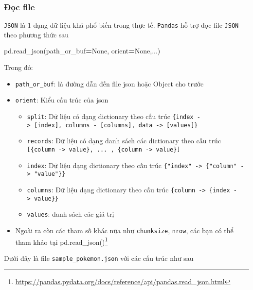 \documentclass[
]{book}
\newenvironment{Shaded}{\begin{snugshade}}{\end{snugshade}}
\newcommand{\NormalTok}[1]{#1}
\newcommand{\OperatorTok}[1]{\textcolor[rgb]{0.81,0.36,0.00}{\textbf{#1}}}
\newcommand{\VariableTok}[1]{\textcolor[rgb]{0.00,0.00,0.00}{#1}}
\providecommand{\tightlist}{%
  \setlength{\itemsep}{0pt}\setlength{\parskip}{0pt}}
\renewcommand{\href}[2]{#2\footnote{\url{#1}}}
\begin{document}
\subsubsection{Đọc file}\label{ux111ux1ecdc-file-1}

\texttt{JSON} là 1 dạng dữ liệu khá phổ biến trong thực tế. \texttt{Pandas} hỗ trợ đọc file \texttt{JSON} theo phương thức sau

\begin{Shaded}
\begin{Highlighting}[]
\NormalTok{pd.read\_json(path\_or\_buf}\OperatorTok{=}\VariableTok{None}\NormalTok{, orient}\OperatorTok{=}\VariableTok{None}\NormalTok{,...)}
\end{Highlighting}
\end{Shaded}

Trong đó:

\begin{itemize}
\item
  \texttt{path\_or\_buf}: là đường dẫn đến file json hoặc Object cho trước
\item
  \texttt{orient}: Kiểu cấu trúc của json

  \begin{itemize}
  \tightlist
  \item
    \texttt{split}: Dữ liệu có dạng dictionary theo cấu trúc \texttt{\{index\ -\textgreater{}\ {[}index{]},\ columns\ -\ {[}columns{]},\ data\ -\textgreater{}\ {[}values{]}\}}
  \item
    \texttt{records}: Dữ liệu có dạng danh sách các dictionary theo cấu trúc \texttt{{[}\{column\ -\textgreater{}\ value\},\ ...\ ,\ \{column\ -\textgreater{}\ value\}{]}}
  \item
    \texttt{index}: Dữ liệu dạng dictionary theo cấu trúc \texttt{\{"index"\ -\textgreater{}\ \{"column"\ -\textgreater{}\ "value"\}\}}
  \item
    \texttt{columns}: Dữ liệu dạng dictionary theo cấu trúc \texttt{\{column\ -\textgreater{}\ \{index\ -\textgreater{}\ value\}\}}
  \item
    \texttt{values}: danh sách các giá trị
  \end{itemize}
\item
  Ngoài ra còn các tham số khác nữa như \texttt{chunksize}, \texttt{nrow}, các bạn có thể tham khảo tại \href{https://pandas.pydata.org/docs/reference/api/pandas.read_json.html}{pd.read\_json()}
\end{itemize}

Dưới đây là file \texttt{sample\_pokemon.json} với các cấu trúc như sau
\end{document}
